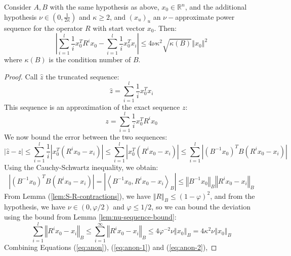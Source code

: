 \begin{lemma}\label{lem:partial-sequence-approximate}Consider $A,B$
with the same hypothesis as above, $x_{0}\in\mathbb{R}^{n}$, and
the additional hypothesis $\nu\in\left(0,\frac{1}{2\kappa}\right)$
and $\kappa\ge2$, and $\left(x_{u}\right)_{u}$ an $\nu-$approximate
power sequence for the operator $R$ with start vector $x_{0}$. Then:
\[
\left|\sum_{i=1}^{l}\frac{1}{i}x_{0}^{T}R^{i}x_{0}-\sum_{i=1}^{l}\frac{1}{i}x_{0}^{T}x_{i}\right|\leq4\nu\kappa^{2}\sqrt{\kappa\left(B\right)}\left\Vert x_{0}\right\Vert ^{2}
\]
 where $\kappa\left(B\right)$ is the condition number of $B$.

\end{lemma}

\begin{proof}

Call $\hat{z}$ the truncated sequence: 
\[
\hat{z}=\sum_{i=1}^{l}\frac{1}{i}x_{0}^{T}x_{i}
\]
This sequence is an approximation of the exact sequence $z$: 
\[
z=\sum_{i=1}^{l}\frac{1}{i}x_{0}^{T}R^{i}x_{0}
\]
We now bound the error between the two sequences: 
\begin{equation}
\left|\hat{z}-z\right|\leq\sum_{i=1}^{l}\frac{1}{i}\left|x_{0}^{T}\left(R^{i}x_{0}-x_{i}\right)\right|\leq\sum_{i=1}^{l}\left|x_{0}^{T}\left(R^{i}x_{0}-x_{i}\right)\right|\leq\sum_{i=1}^{l}\left|\left(B^{-1}x_{0}\right)^{T}B\left(R^{i}x_{0}-x_{i}\right)\right|\label{eq:anon}
\end{equation}
Using the Cauchy-Schwartz inequality, we obtain: 
\begin{equation}
\left|\left(B^{-1}x_{0}\right)^{T}B\left(R^{i}x_{0}-x_{i}\right)\right|=\left|\left\langle B^{-1}x_{0},R^{i}x_{0}-x_{i}\right\rangle _{B}\right|\leq\left\Vert B^{-1}x_{0}\right\Vert _{B}\left\Vert R^{i}x_{0}-x_{i}\right\Vert _{B}\label{eq:anon-1}
\end{equation}
 From Lemma (\ref{lem:S-R-contractions}), we have $\left\Vert R\right\Vert _{B}\leq\left(1-\varphi\right)^{2}$,
and from the hypothesis, we have $\nu\in\left(0,\varphi/2\right)$
and $\varphi\le1/2$, so we can bound the deviation using the bound
from Lemma \ref{lem:nu-sequence-bound}:
\begin{equation}
\sum_{i=1}^{l}\left\Vert R^{i}x_{0}-x_{i}\right\Vert _{B}\leq\sum_{i=1}^{\infty}\left\Vert R^{i}x_{0}-x_{i}\right\Vert _{B}\leq4\varphi^{-2}\nu\left\Vert x_{0}\right\Vert _{B}=4\kappa^{2}\nu\left\Vert x_{0}\right\Vert _{B}\label{eq:anon-2}
\end{equation}
Combining Equations (\ref{eq:anon}), (\ref{eq:anon-1}) and (\ref{eq:anon-2}),

\end{proof}
